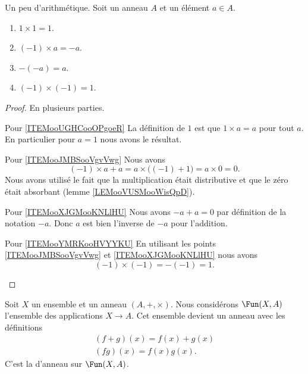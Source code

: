 \begin{lemma}        \label{LEMooLTERooVKgqjn}
    Un peu d'arithmétique. Soit un anneau \( A\) et un élément \( a\in A\).
    \begin{enumerate}
        \item       \label{ITEMooUGHCooOPgoeR}
            \( 1\times 1=1\).
        \item       \label{ITEMooJMBSooVgvVwg}
            \( (-1)\times a=-a\).
        \item       \label{ITEMooXJGMooKNLlHU}
            \( -(-a)=a\).
        \item       \label{ITEMooYMRKooHVYYKU}
            \( (-1)\times (-1)=1\).
    \end{enumerate}
\end{lemma}

\begin{proof}
    En plusieurs parties.
    \begin{subproof}
    \item[Pour \ref{ITEMooUGHCooOPgoeR}]
        La définition de \( 1\) est que \( 1\times a=a\) pour tout \( a\). En particulier pour \( a=1\) nous avons le résultat.
    \item[Pour \ref{ITEMooJMBSooVgvVwg}]
    Nous avons
    \begin{equation}
        (-1)\times a + a= a\times \big( (-1)+1 \big)=a\times 0=0.
    \end{equation}
    Nous avons utilisé le fait que la multiplication était distributive et que le zéro était absorbant (lemme \ref{LEMooVUSMooWisQpD}).

\item[Pour \ref{ITEMooXJGMooKNLlHU}]
    Nous avons \( -a+a=0\) par définition de la notation \( -a\). Donc \( a\) est bien l'inverse de \( -a\) pour l'addition.

\item[Pour \ref{ITEMooYMRKooHVYYKU}]
    En utilisant les points \ref{ITEMooJMBSooVgvVwg} et \ref{ITEMooXJGMooKNLlHU} nous avons
    \begin{equation}
        (-1)\times (-1)=-(-1)=1.
    \end{equation}
    \end{subproof}
\end{proof}

Soit \( X\) un ensemble et un anneau $(A, +, \times)$. Nous considérons \( \Fun(X,A)\) l'ensemble des applications \( X\to A\). Cet ensemble devient un anneau avec les définitions
\begin{subequations}
    \begin{align}
        (f+g)(x)=f(x)+g(x)\\
        (fg)(x)=f(x)g(x).
    \end{align}
\end{subequations}
C'est la  d'anneau sur \( \Fun(X,A)\).

